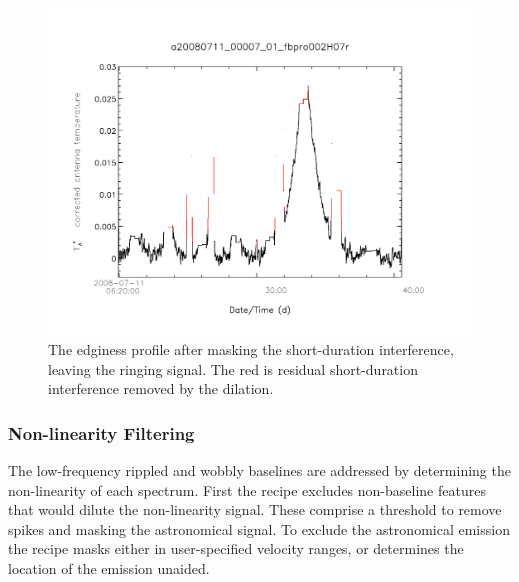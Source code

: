 \documentclass[final,authoryear,5p,times,twocolumn]{elsarticle}
\begin{document}
\begin{figure}[!ht]
\includegraphics[width=\columnwidth]{ringing_edginess_profile}
\caption{The edginess profile after masking the short-duration
  interference, leaving the ringing signal.  The red is residual
  short-duration interference removed by the dilation.}
\label{fig:badbase:ringing_edginess_profile}
\end{figure}


\subsubsection{Non-linearity Filtering}
\label{sec:non-linearity}

The low-frequency rippled and wobbly baselines are addressed by
determining the non-linearity of each spectrum.  First the recipe
excludes non-baseline features that would dilute the non-linearity
signal.  These comprise a threshold to remove spikes and masking the
astronomical signal.  To exclude the astronomical emission the recipe
masks either in user-specified velocity ranges, or determines the
location of the emission unaided.
\end{document}

